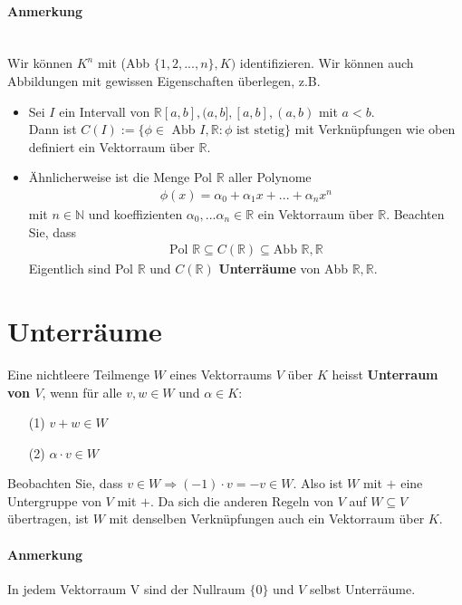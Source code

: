 \documentclass[11pt]{report}
\newcommand*\Zb[1] {\mathbb{#1}}
\newcommand*\f[1] {\textbf{#1}}
\begin{document}
\paragraph{Anmerkung} {\ \\}
Wir können $K^n$ mit (Abb $\{1, 2, ..., n\}, K)$ identifizieren.
Wir können auch Abbildungen mit gewissen Eigenschaften überlegen, z.B.
\begin{itemize}
 \item Sei $I$ ein Intervall von $\Zb{R} [a, b], (a, b], [a, b], (a, b)$ mit $a<b$. \\
Dann ist $C(I):= \{\phi \in$ Abb $I, \Zb{R}: \phi \textrm{ ist stetig}\}$ mit Verknüpfungen wie oben definiert ein Vektorraum über $\Zb{R}$.
 \item Ähnlicherweise ist die Menge Pol $\Zb{R}$ aller Polynome
\begin{align}
 \phi(x) = \alpha_0 + \alpha_1 x + ... + \alpha_n x^n
\end{align}
mit $n \in \Zb{N}$ und koeffizienten $\alpha_0, ... \alpha_n \in \Zb{R}$ ein Vektorraum über $\Zb{R}$.
Beachten Sie, dass
\begin{align}
\text{Pol } \Zb{R} \subseteq C(\Zb{R}) \subseteq \text{Abb }\Zb{R}, \Zb{R}
\end{align}
Eigentlich sind Pol $\Zb{R}$ und $C(\Zb{R})$ \f{Unterräume} von Abb $\Zb{R}, \Zb{R}$.
\end{itemize}

\section{Unterräume}
Eine nichtleere Teilmenge $W$ eines Vektorraums $V$ über $K$ heisst \f{Unterraum von $V$}, wenn für alle $v, w \in W$ und $\alpha \in K$:
\begin{itemize}
 \item[(1)] $v + w \in W$
 \item[(2)] $\alpha \cdot v \in W$
\end{itemize}

Beobachten Sie, dass $v \in W \Rightarrow (-1)\cdot v = -v \in W$. Also ist $W$ mit $+$ eine Untergruppe von $V$ mit $+$. Da sich die anderen Regeln von $V$ auf $W \subseteq V$ übertragen, ist $W$ mit denselben Verknüpfungen auch ein Vektorraum über $K$.

\paragraph{Anmerkung} In jedem Vektorraum V sind der Nullraum $\{0\}$ und $V$ selbst Unterräume.
\end{document}

